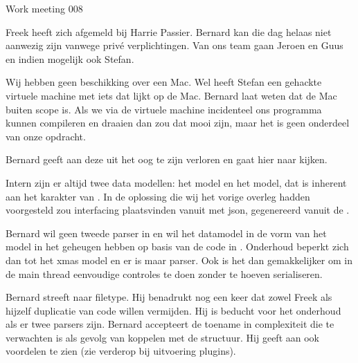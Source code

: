 \documentclass[a4paper,final]{article}
\begin{document}
\begin{Minutes}{Work meeting 008}
\subtitle{Update iteratie 4 met Bernard}

\maketitle%


Freek heeft zich afgemeld bij Harrie Passier. Bernard kan die dag helaas niet
aanwezig zijn vanwege priv\'{e} verplichtingen. Van ons team gaan Jeroen en Guus en 
indien mogelijk ook Stefan. 


Wij hebben geen beschikking over een Mac. Wel heeft Stefan een gehackte virtuele machine met
iets dat lijkt op de Mac. Bernard laat weten dat de Mac buiten scope is. Als we via de virtuele machine
incidenteel ons programma kunnen compileren en draaien dan zou dat mooi zijn, maar het is
geen onderdeel van onze opdracht.


Bernard geeft aan deze uit het oog te zijn verloren en gaat hier naar kijken.



Intern zijn er altijd twee data modellen: het \cpp model en het \qml model, dat is inherent aan
het karakter van \qml. In de oplossing die wij het vorige overleg hadden voorgesteld zou
interfacing plaatsvinden vanuit \qml met json, gegenereerd vanuit de \qml. 

Bernard wil geen tweede parser in \qml en wil het datamodel in de vorm van het \cpp model 
in het geheugen hebben op basis van de code in .
Onderhoud beperkt zich dan tot het xmas model en er is maar \een parser. Ook is het dan gemakkelijker 
om in de main thread eenvoudige controles te doen zonder te hoeven serialiseren.


Bernard streeft naar \een filetype.
Hij benadrukt nog een keer dat zowel Freek als hijzelf duplicatie van code willen vermijden.
Hij is beducht voor het onderhoud als er twee parsers zijn. Bernard accepteert de toename in 
complexiteit die te verwachten is als gevolg van koppelen met de \cpp structuur. Hij geeft aan
ook voordelen te zien (zie verderop bij uitvoering plugins).


\end{Minutes}
\end{document}
